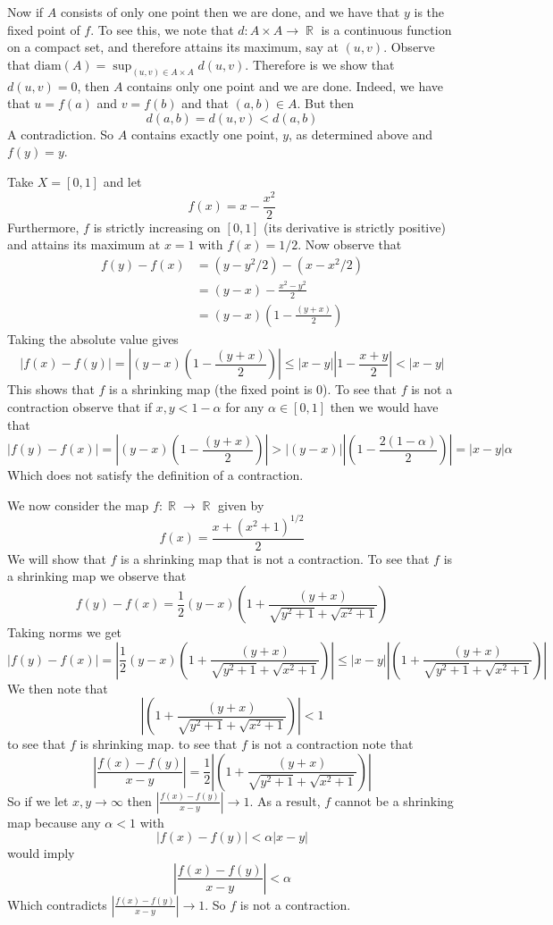 \documentclass{article}
\DeclareMathOperator{\R}{\mathbb{R}}
\newcommand{\problempart}[1]{\noindent{\textbf{(#1)}}}
\newcommand{\diam}[1]{\text{diam}(#1)}
\begin{document}
Now if $A$ consists of only one point then we are done, and we have that $y$ is the fixed point of $f$. To see this, we note that $d: A \times A \to \R$ is a continuous function on a compact set, and therefore attains its maximum, say at $(u,v)$. Observe that $\diam{A} = \sup_{(u,v) \in A \times A} d(u,v)$. Therefore is we show that $d(u,v) = 0$, then $A$ contains only one point and we are done. Indeed, we have that $u = f(a)$ and $v = f(b)$ and that $(a,b) \in A$. But then
\[
d(a,b) = d(u,v) < d(a,b)
\]
A contradiction. So $A$ contains exactly one point, $y$, as determined above and $f(y) = y$. 

\problempart{c} Take $X = [0,1]$ and let
\[
f(x) = x - \frac{x^2}{2}
\]
Furthermore, $f$ is strictly increasing on $[0,1]$ (its derivative is strictly positive) and attains its maximum at $x=1$ with $f(x) = 1/2$. Now observe that 
\begin{align*}
f(y) - f(x) &= (y - y^2/2) - (x - x^2/2) \\
&= (y-x) - \frac{x^2 - y^2}{2} \\
&= (y - x)(1 - \frac{(y+x)}{2}) 
\end{align*}
Taking the absolute value gives
\[
|f(x) - f(y)| = \left|(y - x)\left(1 - \frac{(y+x)}{2}\right) \right| \leq |x-y||1 - \frac{x+y}{2}| < |x- y|
\]
This shows that $f$ is a shrinking map (the fixed point is 0). To see that $f$ is not a contraction observe that if $x,y < 1-\alpha$ for any $\alpha \in [0,1]$ then we would have that
\[
|f(y) - f(x)| = \left|(y - x)\left(1 - \frac{(y+x)}{2}\right) \right| > |(y - x)| \left|\left(1 - \frac{2(1-\alpha)}{2}\right) \right| =|x-y|\alpha
\]
Which does not satisfy the definition of a contraction. 

\problempart{d} We now consider the map $f: \R \to \R$ given by 
\[
f(x) = \frac{x + (x^2 + 1)^{1/2}}{2}
\]
We will show that $f$ is a shrinking map that is not a contraction. To see that $f$ is a shrinking map we observe that 
\[
f(y) - f(x) = \frac{1}{2}(y-x)\left(1 + \frac{(y+x)}{\sqrt{y^2 + 1} + \sqrt{x^2 + 1}}\right)
\]
Taking norms we get
\[
|f(y) - f(x)| = \left| \frac{1}{2}(y-x)\left(1 + \frac{(y+x)}{\sqrt{y^2 + 1} + \sqrt{x^2 + 1}}\right)\right| \leq |x-y|\left|\left(1 + \frac{(y+x)}{\sqrt{y^2 + 1} + \sqrt{x^2 + 1}}\right)\right|
\]
We then note that
\[
\left|\left(1 + \frac{(y+x)}{\sqrt{y^2 + 1} + \sqrt{x^2 + 1}}\right)\right| < 1
\]
to see that $f$ is shrinking map. to see that $f$ is not a contraction note that
\[
\left| \frac{f(x) - f(y)}{x - y}\right| = \frac{1}{2}\left|\left(1 + \frac{(y+x)}{\sqrt{y^2 + 1} + \sqrt{x^2 + 1}}\right)\right|
\]
So if we let $x,y \to \infty$ then $\left| \frac{f(x) - f(y)}{x - y}\right| \to 1$. As a result, $f$ cannot be a shrinking map because any $\alpha < 1$ with 
\[
|f(x) - f(y)| < \alpha|x-y|
\]
would imply 
\[
\left| \frac{f(x) - f(y)}{x - y}\right| < \alpha
\]
Which contradicts $\left| \frac{f(x) - f(y)}{x - y}\right| \to 1$. So $f$ is not a contraction.
\end{document}
